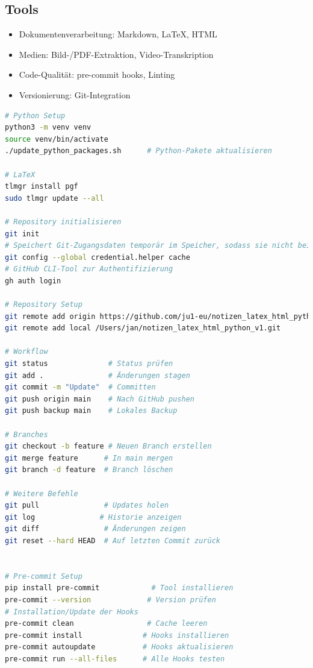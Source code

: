 \documentclass{vorlage-design-main}
\begin{document}
\subsection{Tools}\label{tools}

\begin{itemize}

\item
  Dokumentenverarbeitung: Markdown, LaTeX, HTML
\item
  Medien: Bild-/PDF-Extraktion, Video-Transkription
\item
  Code-Qualität: pre-commit hooks, Linting
\item
  Versionierung: Git-Integration
\end{itemize}

\begin{lstlisting}[language=bash]
# Python Setup
python3 -m venv venv
source venv/bin/activate
./update_python_packages.sh      # Python-Pakete aktualisieren

# LaTeX
tlmgr install pgf
sudo tlmgr update --all

# Repository initialisieren
git init
# Speichert Git-Zugangsdaten temporär im Speicher, sodass sie nicht bei jedem Push/Pull erneut eingegeben werden müssen.
git config --global credential.helper cache
# GitHub CLI-Tool zur Authentifizierung
gh auth login

# Repository Setup
git remote add origin https://github.com/ju1-eu/notizen_latex_html_python_v1.git
git remote add local /Users/jan/notizen_latex_html_python_v1.git

# Workflow
git status              # Status prüfen
git add .               # Änderungen stagen
git commit -m "Update"  # Committen
git push origin main    # Nach GitHub pushen
git push backup main    # Lokales Backup

# Branches
git checkout -b feature # Neuen Branch erstellen
git merge feature      # In main mergen
git branch -d feature  # Branch löschen

# Weitere Befehle
git pull               # Updates holen
git log               # Historie anzeigen
git diff               # Änderungen zeigen
git reset --hard HEAD  # Auf letzten Commit zurück


# Pre-commit Setup
pip install pre-commit            # Tool installieren
pre-commit --version             # Version prüfen
# Installation/Update der Hooks
pre-commit clean                 # Cache leeren
pre-commit install              # Hooks installieren
pre-commit autoupdate           # Hooks aktualisieren
pre-commit run --all-files      # Alle Hooks testen
\end{lstlisting}
\end{document}
